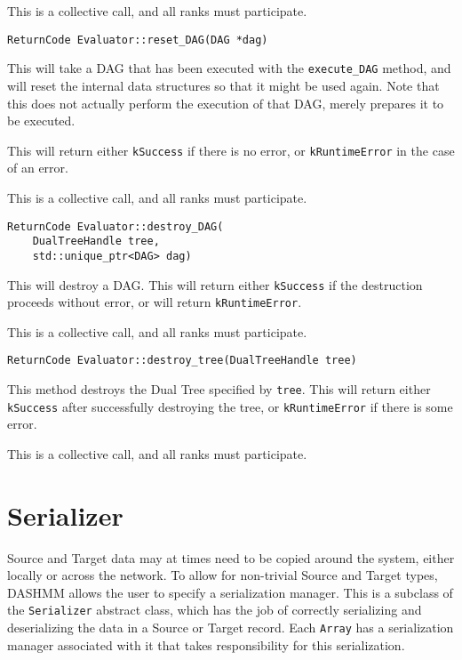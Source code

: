 This is a collective call, and all ranks must participate.

\begin{lstlisting}
ReturnCode Evaluator::reset_DAG(DAG *dag)
\end{lstlisting}

\noindent This will take a DAG that has been executed with the
\texttt{execute\_DAG}
method, and will reset the internal data structures so that it might be used
again. Note that this does not actually perform the execution of that DAG,
merely prepares it to be executed.

This will return either \texttt{kSuccess} if there is no error, or
\texttt{kRuntimeError} in the case of an error.

This is a collective call, and all ranks must participate.

\begin{lstlisting}
ReturnCode Evaluator::destroy_DAG(
    DualTreeHandle tree, 
    std::unique_ptr<DAG> dag)
\end{lstlisting}

\noindent This will destroy a DAG. This will return either \texttt{kSuccess}
if the destruction proceeds without error, or will return
\texttt{kRuntimeError}.

This is a collective call, and all ranks must participate.

\begin{lstlisting}
ReturnCode Evaluator::destroy_tree(DualTreeHandle tree)
\end{lstlisting}

\noindent This method destroys the Dual Tree specified by \texttt{tree}. This
will return either \texttt{kSuccess} after successfully destroying the tree, or
\texttt{kRuntimeError} if there is some error.

This is a collective call, and all ranks must participate.


\section{Serializer}
\label{sec:serializer}

Source and Target data may at times need to be copied around the system, either
locally or across the network. To allow for non-trivial Source and Target
types, DASHMM allows the user to specify a serialization manager. This is
a subclass of the \texttt{Serializer} abstract class, which has the job of
correctly serializing and deserializing the data in a Source or Target
record. Each \texttt{Array} has a serialization manager associated with it that
takes responsibility for this serialization.


